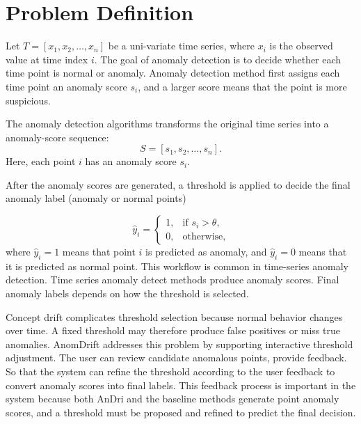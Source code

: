 \section{Problem Definition}

Let \(T=[x_1,x_2,\ldots,x_n]\) be a uni-variate time series, where \(x_i\) is the observed value at time index \(i\). The goal of anomaly detection is to decide whether each time point is normal or anomaly. Anomaly detection method first assigns each time point an anomaly score \(s_i\), and a larger score means that the point is more suspicious.

The anomaly detection algorithms transforms the original time series into a anomaly-score sequence:
\[S=[s_1,s_2,\ldots,s_n].\]
Here, each point \(i\)  has an anomaly score \(s_i\).





After the anomaly scores are generated,  a threshold is applied to decide the final anomaly label (anomaly or normal points)


\[
\hat{y}_i =
\begin{cases}
1, & \text{if } s_i > \theta,\\
0, & \text{otherwise,}
\end{cases}
\]
where \(\hat{y}_i=1\) means that point \(i\) is predicted as anomaly, and \(\hat{y}_i=0\) means that it is predicted as normal point. This workflow is common in time-series anomaly detection. Time series anomaly detect methods produce anomaly scores. Final anomaly labels depends on how the threshold is selected.

Concept drift complicates threshold selection because normal behavior changes over time. A fixed threshold may therefore produce false positives or miss true anomalies. AnomDrift addresses this problem by supporting interactive threshold adjustment. The user can review candidate anomalous points, provide feedback. So that the system can refine the threshold according to the user feedback to convert anomaly scores into final labels. This feedback process is important in the system because both AnDri and the baseline methods generate point anomaly scores, and a threshold must be proposed and refined to predict the final decision.

